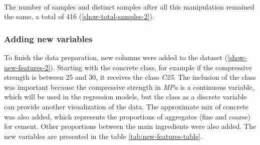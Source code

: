 \documentclass[
]{article}
\begin{document}
~

\begin{table}[H]

\caption{\label{tab:new-features}First 6 samples after reorganization}
\centering
{}
\end{table}

The number of samples and distinct samples after all this manipulation
remained the same, a total of 416 (\ref{show-total-samples-2}).

\hypertarget{adding-new-variables}{%
\subsubsection{Adding new variables}\label{adding-new-variables}}

To finish the data preparation, new columns were added to the dataset
(\ref{show-new-features-2}). Starting with the concrete class, for
example if the compressive strength is between 25 and 30, it receives
the class \emph{C25}. The inclusion of the class was important because
the compressive strength in \emph{MPa} is a continuous variable, which
will be used in the regression models, but the class as a discrete
variable can provide another visualization of the data. The approximate
mix of concrete was also added, which represents the proportions of
aggregates (fine and coarse) for cement. Other proportions between the
main ingredients were also added. The new variables are presented in the
table \ref{tab:new-features-table}.
\end{document}
